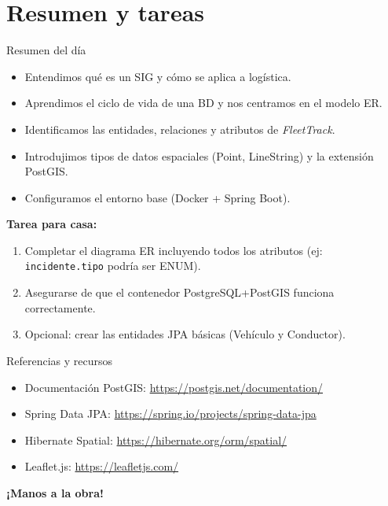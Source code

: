 \documentclass[10pt, aspectratio=169]{beamer}
\begin{document}
\section{Resumen y tareas}
\begin{frame}{Resumen del día}
    \begin{itemize}
        \item Entendimos qué es un SIG y cómo se aplica a logística.
        \item Aprendimos el ciclo de vida de una BD y nos centramos en el modelo ER.
        \item Identificamos las entidades, relaciones y atributos de \textit{FleetTrack}.
        \item Introdujimos tipos de datos espaciales (Point, LineString) y la extensión PostGIS.
        \item Configuramos el entorno base (Docker + Spring Boot).
    \end{itemize}
    \vspace{0.5cm}
    \textbf{Tarea para casa:}
    \begin{enumerate}
        \item Completar el diagrama ER incluyendo todos los atributos (ej: \texttt{incidente.tipo} podría ser ENUM).
        \item Asegurarse de que el contenedor PostgreSQL+PostGIS funciona correctamente.
        \item Opcional: crear las entidades JPA básicas (Vehículo y Conductor).
    \end{enumerate}
\end{frame}

\begin{frame}{Referencias y recursos}
    \begin{itemize}
        \item Documentación PostGIS: \url{https://postgis.net/documentation/}
        \item Spring Data JPA: \url{https://spring.io/projects/spring-data-jpa}
        \item Hibernate Spatial: \url{https://hibernate.org/orm/spatial/}
        \item Leaflet.js: \url{https://leafletjs.com/}
    \end{itemize}
    \vspace{1cm}
    \centering
    \textbf{¡Manos a la obra!}
\end{frame}
\end{document}
